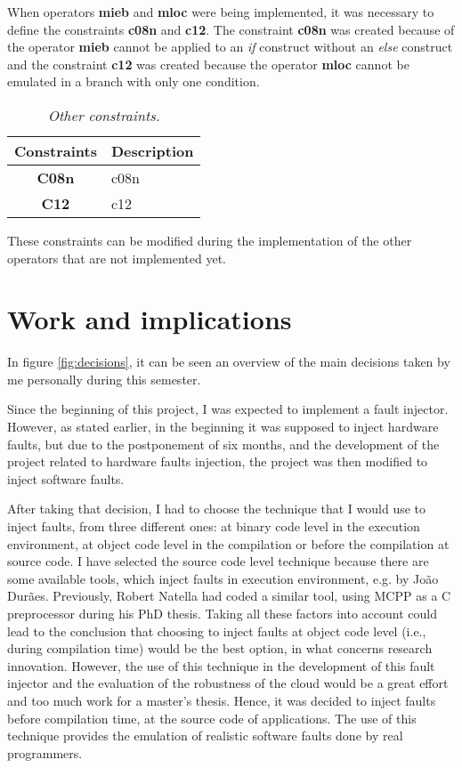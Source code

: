 When operators \textbf{\ac{mieb}} and \textbf{\ac{mloc}} were being implemented, it was necessary to define the constraints \textbf{\ac{c08n}} and \textbf{\ac{c12}}. The constraint \textbf{\ac{c08n}} was created because of the operator \textbf{\ac{mieb}} cannot be applied to an \textit{if} construct without an \textit{else} construct and the constraint \textbf{\ac{c12}} was created because the operator \textbf{\ac{mloc}} cannot be emulated in a branch with only one condition.

\begin{table}[!ht]
\centering
\begin{tabular}{|c|p{12cm}|}
\hline
\textbf{Constraints}            & \multicolumn{1}{c|}{\textbf{Description}}                                     \\ \hline \hline
\textbf{C08n}         & \Acl{c08n} \\ \hline
\textbf{C12}         & \Acl{c12} \\ \hline
\end{tabular}
\caption{\small \sl Other constraints.\label{tab:otherConstraints}}
\end{table}

These constraints can be modified during the implementation of the other operators that are not implemented yet.

\clearpage
\section{Work and implications}

In figure \ref{fig:decisions}, it can be seen an overview of the main decisions taken by me personally during this semester.

Since the beginning of this project, I was expected to implement a fault injector. However, as stated earlier, in the beginning it was supposed to inject hardware faults, but due to the postponement of six months, and the development of the project related to hardware faults injection, the project was then modified to inject software faults.

After taking that decision, I had to choose the technique that I would use to inject faults, from three different ones: at binary code level in the execution environment, at object code level in the compilation or before the compilation at source code. I have selected the source code level technique because there are some available tools, which inject faults in execution environment, e.g. by João Durães. Previously, Robert Natella had coded a similar tool, using MCPP as a C preprocessor during his PhD thesis.
Taking all these factors into account could lead to the conclusion that choosing to inject faults at object code level (i.e., during compilation time) would be the best option, in what concerns research innovation. However, the use of this technique in the development of this fault injector and the evaluation of the robustness of the cloud would be a great effort and too much work for a master's thesis. Hence, it was decided to inject faults before compilation time, at the source code of applications. The use of this technique provides the emulation of realistic software faults done by real programmers.


